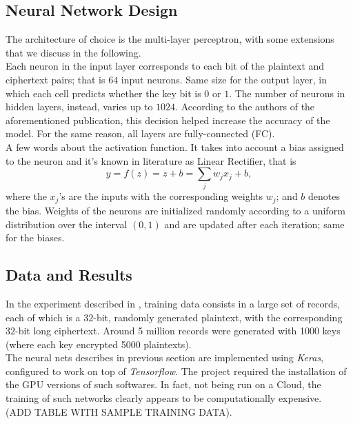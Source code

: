\documentclass[%
    corpo=11pt,
    twoside,
    stile=classica,
    oldstyle,
    autoretitolo,
    tipotesi=magistrale,
    greek,
    evenboxes,
    english
]{toptesi}
\begin{document}
\subsection{Neural Network Design}
The architecture of choice is the multi-layer perceptron, with some extensions that we discuss in the following. \\
Each neuron in the input layer corresponds to each bit of the plaintext and ciphertext pairs; that is $64$ input neurons. Same size for the output layer, in which each cell predicts whether the key bit is $0$ or $1$. The number of neurons in hidden layers, instead, varies up to $1024$. According to the authors of the aforementioned publication, this decision helped increase the accuracy of the model. For the same reason, all layers are fully-connected (FC).\\
A few words about the activation function. It takes into account a bias assigned to the neuron and it's known in literature as Linear Rectifier, that is 
\begin{equation}
y = f(z)= z + b = \sum_j w_jx_j + b,
\end{equation}
where the $x_j$'s are the inputs with the corresponding weights $w_j$; and $b$ denotes the bias. Weights of the neurons are initialized randomly according to a uniform distribution over the interval $(0,1)$ and are updated after each iteration; same for the biases.

\subsection{Data and Results}
In the experiment described in \cite{jay}, training data consists in a large set of records, each of which is a $32$-bit, randomly generated plaintext, with the corresponding $32$-bit long ciphertext. Around 5 million records were generated with 1000 keys (where each key encrypted 5000 plaintexts). \\
The neural nets describes in previous section are implemented using \textit{Keras}, configured to work on top of \textit{Tensorflow}. The project required the installation of the GPU versions of such softwares. In fact, not being run on a Cloud, the training of such networks clearly appears to be computationally expensive. \\
(ADD TABLE WITH SAMPLE TRAINING DATA). \\
\end{document}
